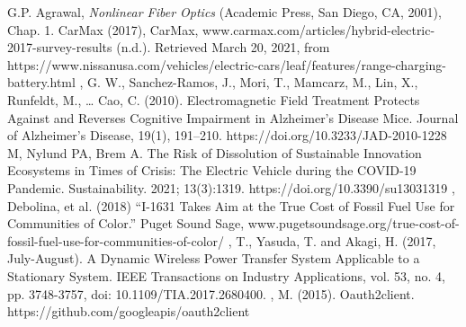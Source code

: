 \begin{thebibliography}{99}
\setlength{\parskip}{1em}

 G.P. Agrawal, {\em Nonlinear Fiber Optics} (Academic
Press, San Diego, CA, 2001), Chap. 1.
 CarMax (2017), CarMax, www.carmax.com/articles/hybrid-electric-2017-survey-results
 (n.d.). Retrieved March 20, 2021, from https://www.nissanusa.com/vehicles/electric-cars/leaf/features/range-charging-battery.html
, G. W., Sanchez-Ramos, J., Mori, T., Mamcarz, M., Lin, X., Runfeldt, M., … Cao, C. (2010). Electromagnetic Field Treatment Protects Against and Reverses Cognitive Impairment in Alzheimer’s Disease Mice. Journal of Alzheimer’s Disease, 19(1), 191–210. https://doi.org/10.3233/JAD-2010-1228
 M, Nylund PA, Brem A. The Risk of Dissolution of Sustainable Innovation Ecosystems in Times of Crisis: The Electric Vehicle during the COVID-19 Pandemic. Sustainability. 2021; 13(3):1319. https://doi.org/10.3390/su13031319
, Debolina, et al. (2018) “I-1631 Takes Aim at the True Cost of Fossil Fuel Use for Communities of Color.” Puget Sound Sage, www.pugetsoundsage.org/true-cost-of-fossil-fuel-use-for-communities-of-color/
, T., Yasuda, T. and Akagi, H. (2017, July-August). A Dynamic Wireless Power Transfer System Applicable to a Stationary System. IEEE Transactions on Industry Applications, vol. 53, no. 4, pp. 3748-3757, doi: 10.1109/TIA.2017.2680400.
, M. (2015). Oauth2client. https://github.com/googleapis/oauth2client 

\end{thebibliography}
